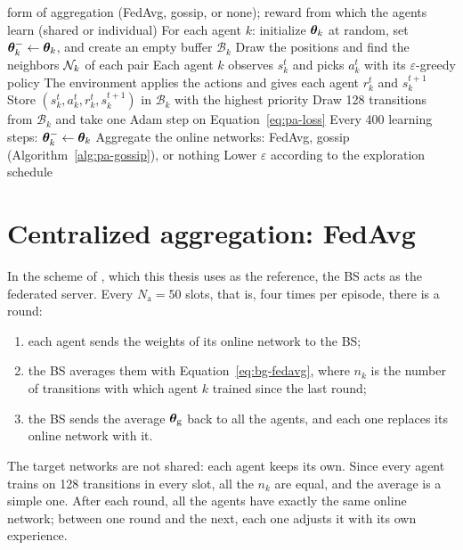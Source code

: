 \begin{algorithm}[tbp]
  \caption{Training of the $K$ agents with periodic aggregation}
  \label{alg:pa-training}
  \begin{algorithmic}[1]
    \Require form of aggregation (\acs{FedAvg}, gossip, or none); reward from which the agents learn
      (shared or individual)
    \State For each agent $k$: initialize $\bm{\theta}_k$ at random, set $\bm{\theta}_k^{-} \gets \bm{\theta}_k$, and
      create an empty buffer $\mathcal{B}_k$
      \State Draw the positions and find the neighbors $\mathcal{N}_k$ of each pair
        \State Each agent $k$ observes $s_k^t$ and picks $a_k^t$ with its $\varepsilon$-greedy policy
        \State The environment applies the actions and gives each agent $r_k^t$ and $s_k^{t+1}$
          \State Store $(s_k^t, a_k^t, r_k^t, s_k^{t+1})$ in $\mathcal{B}_k$ with the highest priority
          \State Draw 128 transitions from $\mathcal{B}_k$ and take one Adam step on
            Equation~\ref{eq:pa-loss}
          \State Every 400 learning steps: $\bm{\theta}_k^{-} \gets \bm{\theta}_k$
        \EndFor
          \State Aggregate the online networks: \acs{FedAvg}, gossip (Algorithm~\ref{alg:pa-gossip}), or
            nothing
        \EndIf
        \State Lower $\varepsilon$ according to the exploration schedule
      \EndFor
    \EndFor
  \end{algorithmic}
\end{algorithm}

\section{Centralized aggregation: FedAvg}
\label{sec:pa-fedavg}

In the scheme of \citet{li+22fedmarl}, which this thesis uses as the reference, the \ac{BS} acts as the
federated server. Every $N_{\mathrm{a}} = 50$ slots, that is, four times per episode, there is a round:
\begin{enumerate}[nosep]
  \item each agent sends the weights of its online network to the \ac{BS};
  \item the \ac{BS} averages them with Equation~\ref{eq:bg-fedavg}, where $n_k$ is the number of transitions
    with which agent $k$ trained since the last round;
  \item the \ac{BS} sends the average $\bm{\theta}_{\mathrm{g}}$ back to all the agents, and each one replaces
    its online network with it.
\end{enumerate}
The target networks are not shared: each agent keeps its own. Since every agent trains on 128 transitions in
every slot, all the $n_k$ are equal, and the average is a simple one. After each round, all the agents have
exactly the same online network; between one round and the next, each one adjusts it with its own
experience.

